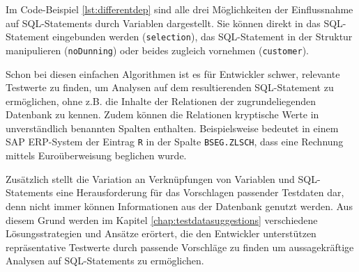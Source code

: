 Im Code-Beispiel \ref{lst:differentdep} sind alle drei Möglichkeiten der Einflussnahme auf SQL-Statements durch Variablen dargestellt.
Sie können direkt in das SQL-Statement eingebunden werden (\texttt{selection}), das SQL-Statement in der Struktur manipulieren (\texttt{noDunning}) oder beides zugleich vornehmen (\texttt{customer}).

Schon bei diesen einfachen Algorithmen ist es für Entwickler schwer, relevante Testwerte zu finden, um Analysen auf dem resultierenden SQL-Statement zu ermöglichen, ohne z.B. die Inhalte der Relationen der zugrundeliegenden Datenbank zu kennen.
Zudem können die Relationen kryptische Werte in unverständlich benannten Spalten enthalten.
Beispielsweise bedeutet in einem SAP ERP-System der Eintrag \texttt{R} in der Spalte \texttt{BSEG.ZLSCH}, dass eine Rechnung mittels Euroüberweisung beglichen wurde.

Zusätzlich stellt die Variation an Verknüpfungen von Variablen und SQL-Statements eine Herausforderung für das Vorschlagen passender Testdaten dar, denn nicht immer können Informationen aus der Datenbank genutzt werden.
Aus diesem Grund werden im Kapitel \ref{chap:testdatasuggestions} verschiedene Lösungsstrategien und Ansätze erörtert, die den Entwickler unterstützen repräsentative Testwerte durch passende Vorschläge zu finden um aussagekräftige Analysen auf SQL-Statements zu ermöglichen.
